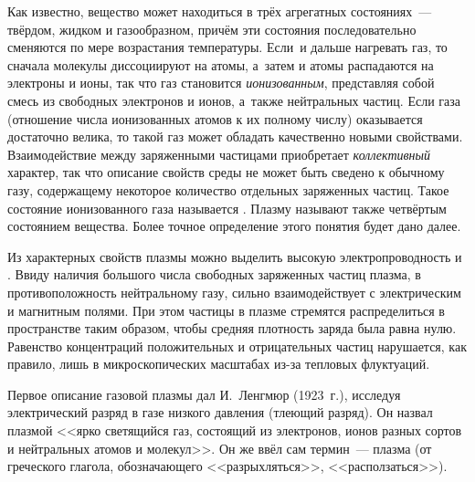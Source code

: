 
Как известно, вещество может находиться в трёх агрегатных состояниях~--- твёрдом,
жидком и газообразном, причём эти
состояния последовательно сменяются по мере возрастания температуры. Если~и
дальше нагревать газ, то сначала молекулы диссоциируют на атомы, а~затем и атомы
распадаются на электроны и ионы, так что газ становится \emph{ионизованным},
представляя собой смесь из свободных электронов и ионов, а~также нейтральных
частиц. Если  газа
(отношение числа ионизованных атомов к их полному числу) оказывается достаточно велика, то
такой газ может обладать качественно новыми свойствами.
Взаимодействие между заряженными частицами приобретает \emph{коллективный} характер,
так что описание свойств среды не может быть сведено к обычному газу,
содержащему некоторое количество отдельных заряженных частиц.
Такое состояние ионизованного газа называется .
Плазму называют также четвёртым состоянием вещества.
Более точное определение этого понятия будет дано далее.

Из характерных свойств плазмы можно выделить высокую электропроводность и
. Ввиду наличия большого числа свободных
заряженных частиц плазма, в противоположность нейтральному газу, сильно
взаимодействует с электрическим и магнитным полями.
При этом частицы в плазме стремятся распределиться в пространстве таким образом,
чтобы средняя плотность заряда была равна нулю. Равенство концентраций
положительных и отрицательных частиц нарушается, как правило,
лишь в микроскопических масштабах из-за тепловых флуктуаций.

Первое описание газовой плазмы дал И.~Ленгмюр (1923~г.), исследуя электрический
разряд в газе низкого давления (тлеющий разряд). Он назвал плазмой <<ярко
светящийся газ, состоящий из электронов, ионов разных сортов и нейтральных
атомов и молекул>>. Он же ввёл сам термин~--- плазма (от греческого глагола,
обозначающего <<разрыхляться>>, <<расползаться>>).

